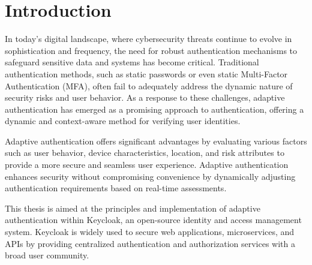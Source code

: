 \documentclass[
  digital,     %
  oneside,     %
  nosansbold,  %
  nocolorbold, %
  lof,         %
  nolot,         %
]{fithesis4}
\begin{document}
\chapter*{Introduction}

In today’s digital landscape, where cybersecurity threats continue to evolve in sophistication and frequency, the need for robust authentication mechanisms to safeguard sensitive data and systems has become
critical.
Traditional authentication methods, such as static passwords or even static Multi-Factor Authentication (MFA), often fail to adequately address the dynamic nature of security risks and user behavior.
As a response to these challenges, adaptive authentication has emerged as a promising approach to authentication, offering a dynamic and context-aware method for verifying user identities.

Adaptive authentication offers significant advantages by evaluating various factors such as user behavior, device characteristics, location, and risk attributes to provide a more secure and seamless user experience.
Adaptive authentication enhances security without compromising convenience by dynamically adjusting authentication requirements based on real-time assessments.

This thesis is aimed at the principles and implementation of adaptive authentication within Keycloak, an open-source identity and access management system.
Keycloak is widely used to secure web applications, microservices, and APIs by providing centralized authentication and authorization services with a broad user community.
\end{document}
